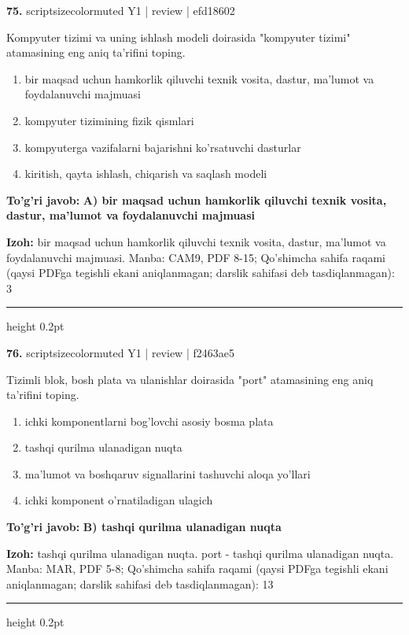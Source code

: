 \documentclass[10pt,a4paper]{article}
\begin{document}
{\bfseries\sffamily\color{ink} 75.} {scriptsizecolor{muted} Y1 | review | efd18602}
\par
Kompyuter tizimi va uning ishlash modeli doirasida "kompyuter tizimi" atamasining eng aniq ta'rifini toping.
\begin{enumerate}[label=\Alph*),leftmargin=9mm]
\item bir maqsad uchun hamkorlik qiluvchi texnik vosita, dastur, ma'lumot va foydalanuvchi majmuasi
\item kompyuter tizimining fizik qismlari
\item kompyuterga vazifalarni bajarishni ko'rsatuvchi dasturlar
\item kiritish, qayta ishlash, chiqarish va saqlash modeli
\end{enumerate}
\begin{tcolorbox}[enhanced,breakable,colback=teal!4,colframe=teal!60!black,boxrule=0.45pt,arc=1.2mm,left=2.7mm,right=2.7mm,top=1.8mm,bottom=1.8mm,before skip=2mm,after skip=2mm]
{\bfseries\sffamily\color{teal}To'g'ri javob:} \textbf{A) bir maqsad uchun hamkorlik qiluvchi texnik vosita, dastur, ma'lumot va foydalanuvchi majmuasi}
\par\smallskip
{\bfseries Izoh:} bir maqsad uchun hamkorlik qiluvchi texnik vosita, dastur, ma'lumot va foydalanuvchi majmuasi. Manba: CAM9, PDF 8-15; Qo'shimcha sahifa raqami (qaysi PDFga tegishli ekani aniqlanmagan; darslik sahifasi deb tasdiqlanmagan): 3
\end{tcolorbox}
\vspace{2mm}\hrule height 0.2pt\vspace{3mm}

{\bfseries\sffamily\color{ink} 76.} {scriptsizecolor{muted} Y1 | review | f2463ae5}
\par
Tizimli blok, bosh plata va ulanishlar doirasida "port" atamasining eng aniq ta'rifini toping.
\begin{enumerate}[label=\Alph*),leftmargin=9mm]
\item ichki komponentlarni bog'lovchi asosiy bosma plata
\item tashqi qurilma ulanadigan nuqta
\item ma'lumot va boshqaruv signallarini tashuvchi aloqa yo'llari
\item ichki komponent o'rnatiladigan ulagich
\end{enumerate}
\begin{tcolorbox}[enhanced,breakable,colback=teal!4,colframe=teal!60!black,boxrule=0.45pt,arc=1.2mm,left=2.7mm,right=2.7mm,top=1.8mm,bottom=1.8mm,before skip=2mm,after skip=2mm]
{\bfseries\sffamily\color{teal}To'g'ri javob:} \textbf{B) tashqi qurilma ulanadigan nuqta}
\par\smallskip
{\bfseries Izoh:} tashqi qurilma ulanadigan nuqta. port - tashqi qurilma ulanadigan nuqta. Manba: MAR, PDF 5-8; Qo'shimcha sahifa raqami (qaysi PDFga tegishli ekani aniqlanmagan; darslik sahifasi deb tasdiqlanmagan): 13
\end{tcolorbox}
\vspace{2mm}\hrule height 0.2pt\vspace{3mm}
\end{document}
